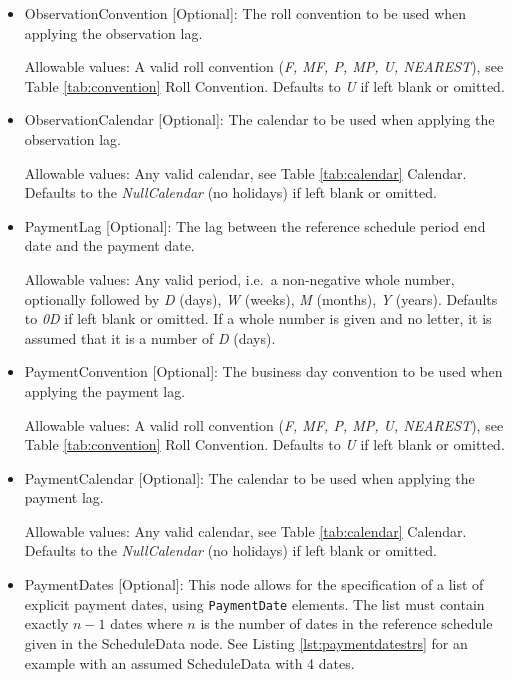 \begin{itemize}
\begin{itemize}
  \item ObservationConvention [Optional]: The roll convention to be used when applying the observation lag.
  
    Allowable values: A valid roll convention (\emph{F, MF, P, MP, U, NEAREST}), see Table \ref{tab:convention} Roll Convention. Defaults to \emph{U} if left blank or omitted.
    
  \item ObservationCalendar [Optional]: The calendar to be used when applying the observation lag.
  
      Allowable values: Any valid calendar, see Table \ref{tab:calendar} Calendar. Defaults to the \emph{NullCalendar} (no holidays) if left blank or omitted.
      
  \item PaymentLag [Optional]: The lag between the reference schedule period end date and the payment date.
  
    Allowable values: Any valid period, i.e.\ a non-negative whole number, optionally followed by \emph{D} (days), \emph{W} (weeks), \emph{M} (months),
  \emph{Y} (years). Defaults to \emph{0D} if left blank or omitted. If a whole number is given and no letter, it is assumed that it is a number of  \emph{D} (days).
    
  \item PaymentConvention [Optional]: The business day convention to be used when applying the payment lag.
  
    Allowable values: A valid roll convention (\emph{F, MF, P, MP, U, NEAREST}), see Table \ref{tab:convention} Roll Convention. Defaults to \emph{U} if left blank or omitted.
    
  \item PaymentCalendar [Optional]: The calendar to be used when applying the payment lag.
  
    Allowable values: Any valid calendar, see Table \ref{tab:calendar} Calendar. Defaults to the \emph{NullCalendar} (no holidays) if left blank or omitted.
    
  \item PaymentDates [Optional]: This node allows for the specification of a list of explicit payment dates, using
    \lstinline!PaymentDate! elements. The list must contain exactly $n-1$ dates where $n$ is the number of dates in the
    reference schedule given in the ScheduleData node. See Listing \ref{lst:paymentdatestrs} for an example with an
    assumed ScheduleData with 4 dates.
    

\end{itemize}
\end{itemize}

